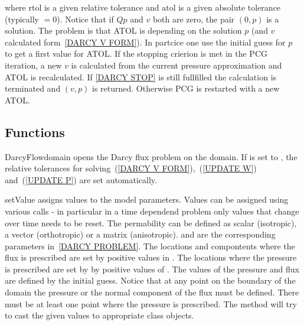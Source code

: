 where rtol is a given relative tolerance and $\mbox{atol}$ is a given absolute tolerance (typically $=0$).  
Notice that if $Qp$ and $v$ both are zero, the pair $(0,p)$ is a solution.
The problem is that ATOL is depending on the solution $p$ (and $v$ calculated form~\ref{DARCY V FORM}). In partcice one use the initial guess for $p$ 
to get a first value for ATOL. If the stopping crierion is met in the PCG iteration, a new $v$ is calculated from the current pressure approximation and ATOL is recalculated. If \ref{DARCY STOP} is still fullfilled the calculation is terminated and $(v,p)$ is returned. Otherwise PCG is restarted with a new ATOL.

\subsection{Functions}
\begin{classdesc}{DarcyFlow}{domain }
opens the Darcy flux problem on the \Domain domain.
If  is set to \True, 
the relative tolerances for solving~(\ref{DARCY V FORM}),~(\ref{UPDATE W})
and~(\ref{UPDATE P}) are set automatically.
\end{classdesc}

\begin{methoddesc}[DarcyFlow]{setValue}{}
assigns values to the model parameters. Values can be assigned using various calls - in particular 
in a time dependend problem only values that change over time needs to be reset. The permability can be defined as scalar (isotropic), a vector (orthotropic) or a matrix (anisotropic). 
 and  are the corresponding parameters in~\ref{DARCY PROBLEM}.
The locations and compontents where the flux is prescribed are set by positive values in
. 
The locations where the pressure is prescribed are set by 
by positive values of . 
The values of the pressure and flux are defined by the initial guess.
Notice that at any point on the boundary of the domain the pressure or the normal component of
the flux must be defined. There must be at least one point where the pressure is prescribed. 
The method will try to cast the given values to appropriate 
\Data class objects.
\end{methoddesc}

